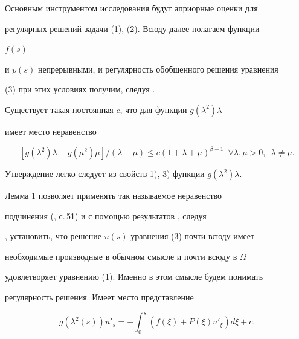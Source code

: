 Основным инструментом исследования будут априорные оценки для 


регулярных решений задачи (1), (2). Всюду далее полагаем функции 


$f(s)$ 


и $p(s)$ непрерывными, и регулярность обобщенного решения уравнения 


(3) при этих условиях получим, следуя \cite{1}. 


 


\begin{lem} 


Существует такая постоянная $c$, что для функции $g(\lambda^2)\lambda$ 


имеет место неравенство 


\begin{equation} 


[g(\lambda^2)\lambda-g(\mu^2)\mu]/(\lambda-\mu)\le 


c(1+\lambda+\mu)^{\beta-1}\ \; \forall\lambda,\mu>0, 


\ \; \lambda\ne\mu. 


\end{equation} 


\end{lem} 


 


\begin{pf} 


Утверждение легко следует из свойств 1), 3) функции $g(\lambda^2)\lambda$.


\end{pf} 


 


Лемма 1 позволяет применять так называемое неравенство 


подчинения (\cite{3}, с.\,51) и с помощью результатов \cite{5}, следуя 


\cite{4}, установить, что решение $u(s)$ уравнения (3) почти всюду имеет 


необходимые производные в обычном смысле и почти всюду в $\Omega$ 


удовлетворяет уравнению (1). Именно в этом смысле будем понимать 


регулярность решения. Имеет место представление 


\begin{equation} 


g(\lambda^2(s))u'_s=-\int^s_0(f(\xi)+P(\xi)u'_\xi)d\xi+c. 


\end{equation} 


